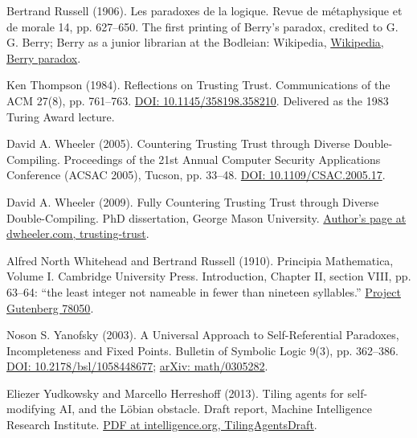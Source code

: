 \documentclass[11pt,twoside]{article}
\theoremstyle{thielethm}
\theoremstyle{thieledef}
\theoremstyle{thieledef}
\theoremstyle{thieledef}
\theoremstyle{thielethm}
\theoremstyle{thieleobs}
\theoremstyle{thielethm}
\begin{document}
\noindent Bertrand Russell (1906). Les paradoxes de la logique. Revue de m\'etaphysique et de morale 14, pp. 627--650. The first printing of Berry's paradox, credited to G. G. Berry; Berry as a junior librarian at the Bodleian: Wikipedia, \href{https://en.wikipedia.org/wiki/Berry_paradox}{Wikipedia, Berry paradox}.
\par\medskip

\noindent Ken Thompson (1984). Reflections on Trusting Trust. Communications of the ACM 27(8), pp. 761--763. \href{https://doi.org/10.1145/358198.358210}{DOI: 10.1145/358198.358210}. Delivered as the 1983 Turing Award lecture.
\par\medskip

\noindent David A. Wheeler (2005). Countering Trusting Trust through Diverse Double-Compiling. Proceedings of the 21st Annual Computer Security Applications Conference (ACSAC 2005), Tucson, pp. 33--48. \href{https://doi.org/10.1109/CSAC.2005.17}{DOI: 10.1109/CSAC.2005.17}.
\par\medskip

\noindent David A. Wheeler (2009). Fully Countering Trusting Trust through Diverse Double-Compiling. PhD dissertation, George Mason University. \href{https://dwheeler.com/trusting-trust/}{Author's page at dwheeler.com, trusting-trust}.
\par\medskip

\noindent Alfred North Whitehead and Bertrand Russell (1910). Principia Mathematica, Volume I. Cambridge University Press. Introduction, Chapter II, section VIII, pp. 63--64: ``the least integer not nameable in fewer than nineteen syllables.'' \href{https://www.gutenberg.org/ebooks/78050}{Project Gutenberg 78050}.
\par\medskip

\noindent Noson S. Yanofsky (2003). A Universal Approach to Self-Referential Paradoxes, Incompleteness and Fixed Points. Bulletin of Symbolic Logic 9(3), pp. 362--386. \href{https://doi.org/10.2178/bsl/1058448677}{DOI: 10.2178/bsl/1058448677}; \href{https://arxiv.org/abs/math/0305282}{arXiv: math/0305282}.
\par\medskip

\noindent Eliezer Yudkowsky and Marcello Herreshoff (2013). Tiling agents for self-modifying AI, and the L\"obian obstacle. Draft report, Machine Intelligence Research Institute. \href{https://intelligence.org/files/TilingAgentsDraft.pdf}{PDF at intelligence.org, TilingAgentsDraft}.
\par\medskip
\end{document}
